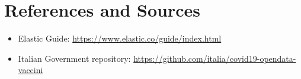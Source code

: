 \documentclass{article}
\begin{document}
\section{References and Sources}
\begin{itemize}
    \item Elastic Guide: \url{https://www.elastic.co/guide/index.html}
    \item Italian Government repository: \url{https://github.com/italia/covid19-opendata-vaccini}
    
\end{itemize}
\end{document}
